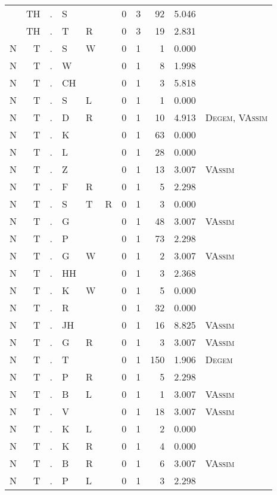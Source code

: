 \begin{longtable}{r@{ } r@{ } c@{ } l@{ } l@{ } l@{ } r r r r l }
 & TH & . & S &  &  & 0 & 3 & 92 & 5.046 &  \\
 & TH & . & T & R &  & 0 & 3 & 19 & 2.831 &  \\
N & T & . & S & W &  & 0 & 1 & 1 & 0.000 &  \\
N & T & . & W &  &  & 0 & 1 & 8 & 1.998 &  \\
N & T & . & CH &  &  & 0 & 1 & 3 & 5.818 &  \\
N & T & . & S & L &  & 0 & 1 & 1 & 0.000 &  \\
N & T & . & D & R &  & 0 & 1 & 10 & 4.913 & \textsc{Degem}, \textsc{VAssim} \\
N & T & . & K &  &  & 0 & 1 & 63 & 0.000 &  \\
N & T & . & L &  &  & 0 & 1 & 28 & 0.000 &  \\
N & T & . & Z &  &  & 0 & 1 & 13 & 3.007 & \textsc{VAssim} \\
N & T & . & F & R &  & 0 & 1 & 5 & 2.298 &  \\
N & T & . & S & T & R & 0 & 1 & 3 & 0.000 &  \\
N & T & . & G &  &  & 0 & 1 & 48 & 3.007 & \textsc{VAssim} \\
N & T & . & P &  &  & 0 & 1 & 73 & 2.298 &  \\
N & T & . & G & W &  & 0 & 1 & 2 & 3.007 & \textsc{VAssim} \\
N & T & . & HH &  &  & 0 & 1 & 3 & 2.368 &  \\
N & T & . & K & W &  & 0 & 1 & 5 & 0.000 &  \\
N & T & . & R &  &  & 0 & 1 & 32 & 0.000 &  \\
N & T & . & JH &  &  & 0 & 1 & 16 & 8.825 & \textsc{VAssim} \\
N & T & . & G & R &  & 0 & 1 & 3 & 3.007 & \textsc{VAssim} \\
N & T & . & T &  &  & 0 & 1 & 150 & 1.906 & \textsc{Degem} \\
N & T & . & P & R &  & 0 & 1 & 5 & 2.298 &  \\
N & T & . & B & L &  & 0 & 1 & 1 & 3.007 & \textsc{VAssim} \\
N & T & . & V &  &  & 0 & 1 & 18 & 3.007 & \textsc{VAssim} \\
N & T & . & K & L &  & 0 & 1 & 2 & 0.000 &  \\
N & T & . & K & R &  & 0 & 1 & 4 & 0.000 &  \\
N & T & . & B & R &  & 0 & 1 & 6 & 3.007 & \textsc{VAssim} \\
N & T & . & P & L &  & 0 & 1 & 3 & 2.298 &  \\

\end{longtable}
